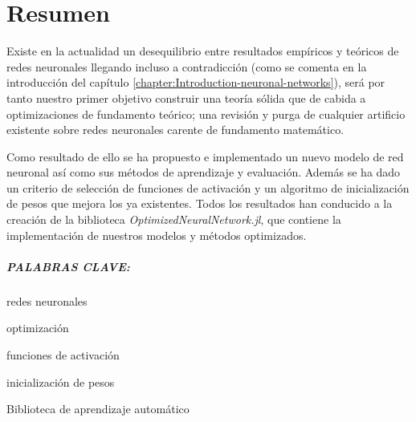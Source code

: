 %


\chapter*{Resumen}\label{ch:resumen}

Existe en la actualidad un desequilibrio entre resultados empíricos 
y teóricos de redes neuronales llegando incluso a contradicción
 (como se comenta en la introducción del capítulo 
 \ref{chapter:Introduction-neuronal-networks}), será por tanto
nuestro primer objetivo construir una teoría sólida
que de cabida a 
 optimizaciones de fundamento teórico; 
una revisión y
 purga de cualquier artificio existente sobre 
 redes neuronales carente de fundamento matemático. 

Como resultado de ello se ha propuesto e implementado 
un nuevo modelo de red neuronal así como sus 
métodos de aprendizaje y evaluación. 
Además se ha dado un criterio de selección de 
funciones de activación y un algoritmo de 
inicialización de pesos que mejora los ya existentes. 
Todos los resultados han conducido a la creación de 
la biblioteca \textit{OptimizedNeuralNetwork.jl}, 
que contiene la implementación de nuestros modelos y
 métodos optimizados. 

\paragraph{PALABRAS CLAVE:}
\begin{itemize*}[label=,itemsep=1em,itemjoin=\hspace{1em}]
  \item redes neuronales
  \item optimización 
  \item funciones de activación 
  \item inicialización de pesos
  \item Biblioteca de aprendizaje automático
\end{itemize*}

\endinput
